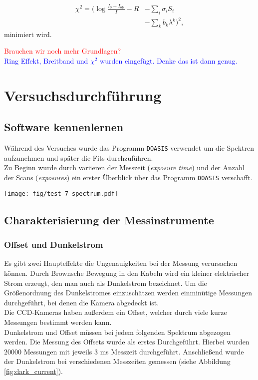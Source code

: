 \documentclass[12pt, a4paper, bibliography=totoc]{scrartcl}
\begin{document}
\begin{multicols}{2}
\begin{align*}
    \chi^2 = ( \log \frac{I_0 + I_\text{ofs}}{I} - R & - \sum_i \sigma_i S_i \\ 
    & - \sum_k b_k \lambda^k )^2 ,
\end{align*}
minimiert wird.

\textcolor{red}{Brauchen wir noch mehr Grundlagen?}\\
\textcolor{blue}{Ring Effekt, Breitband und $\chi^2$ wurden eingefügt. Denke das ist dann genug.}

\section{Versuchsdurchführung}\label{sec:versuchsdurchführung}

\subsection{Software kennenlernen}\label{get_to_know_the_software}

Während des Versuches wurde das Programm \verb*+DOASIS+ verwendet um die Spektren aufzunehmen und später die Fits durchzuführen.\\
Zu Beginn wurde durch variieren der Messzeit (\textit{exposure time}) und der Anzahl der Scans (\textit{exposures}) ein erster Überblick über das Programm \verb*+DOASIS+ verschafft.

\begin{center}
	\texttt{[image: fig/test\_7\_spectrum.pdf]}
	\label{fig:test_spectrum}

\end{center}

\subsection{Charakterisierung der Messinstrumente}\label{ssec:characteristic_of_the_instruments}

\subsubsection{Offset und Dunkelstrom}\label{sssec:O&D}

Es gibt zwei Haupteffekte die Ungenauigkeiten bei der Messung verursachen können.
Durch Brownsche Bewegung in den Kabeln wird ein kleiner elektrischer Strom erzeugt, den man auch als Dunkelstrom bezeichnet.
Um die Größenordnung des Dunkelstromes einzuschätzen werden einminütige Messungen durchgeführt, bei denen die Kamera abgedeckt ist.\\
Die CCD-Kameras haben außerdem ein Offset, welcher durch viele kurze Messungen bestimmt werden kann.\\
Dunkelstrom und Offset müssen bei jedem folgenden Spektrum abgezogen werden.
Die Messung des Offsets wurde als erstes Durchgeführt. 
Hierbei wurden $20000$ Messungen mit jeweils $3$ \si{ms} Messzeit durchgeführt.
Anschließend wurde der Dunkelstrom bei verschiedenen Messzeiten gemessen (siehe Abbildung \ref{fig:dark_current}).
    

\end{multicols}
\end{document}
